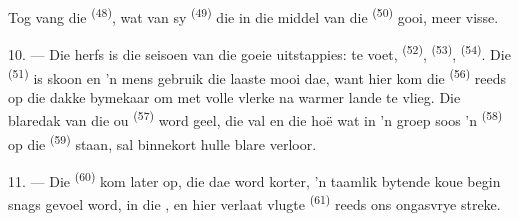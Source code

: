 Tog vang die  \textsuperscript{(48)}, wat van sy 
\textsuperscript{(49)} die  in die middel van die 
\textsuperscript{(50)} gooi, meer visse.

10. --- Die herfs is die seisoen van die goeie uitstappies: te voet, 
\textsuperscript{(52)},  \textsuperscript{(53)}, 
\textsuperscript{(54)}. Die  \textsuperscript{(51)} is skoon en 'n mens
gebruik die laaste mooi dae, want hier kom die 
\textsuperscript{(56)} reeds op die dakke bymekaar om met volle vlerke na warmer lande
te vlieg. Die blaredak van die ou  \textsuperscript{(57)} word geel,
die  val en die hoë  wat in 'n groep soos 'n 
\textsuperscript{(58)} op die  \textsuperscript{(59)} staan, sal binnekort
hulle blare verloor.

11. --- Die  \textsuperscript{(60)} kom later op, die dae word korter, 'n
taamlik bytende koue begin snags gevoel word, in die , en hier verlaat
vlugte  \textsuperscript{(61)} reeds ons ongasvrye streke.
\VUsaut{6.0mm}
\VUfilet{22mm}
